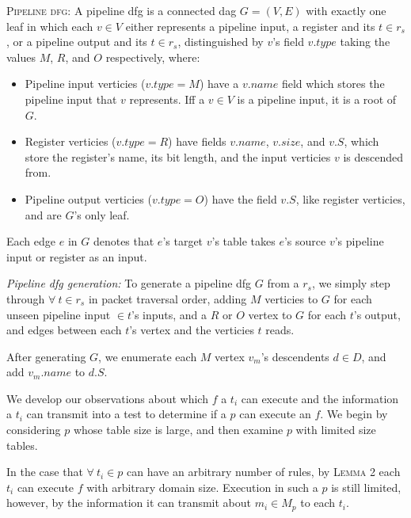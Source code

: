 \vspace{2mm}
\noindent \textsc{Pipeline dfg:} A pipeline dfg is a connected dag $G = (V, E)$ with exactly one leaf in which each $v \in V$ either represents a pipeline input, a register and its $t \in r_s$, or a pipeline output and its $t \in r_s$, distinguished by $v$'s field $v.type$ taking the values $M$, $R$, and $O$ respectively, where:
\begin{itemize}

 \item Pipeline input verticies ($v.type = M$) have a $v.name$ field which stores the pipeline input that $v$ represents. Iff a $v \in V$ is a pipeline input, it is a root of $G$.

 \item Register verticies ($v.type = R$) have fields $v.name$, $v.size$, and $v.S$, which store the register's name, its bit length, and the input verticies $v$ is descended from.

 \item Pipeline output verticies ($v.type = O$) have the field $v.S$, like register verticies, and are $G$'s only leaf.

\end{itemize}

\noindent Each edge $e$ in $G$ denotes that $e$'s target $v$'s table takes $e$'s source $v$'s pipeline input or register as an input.
\vspace{2mm}

\noindent \textit{Pipeline dfg generation:} To generate a pipeline dfg $G$ from a $r_s$, we simply step through $\forall\ t \in r_s$ in packet traversal order, adding $M$ verticies to $G$ for each unseen pipeline input $\in t$'s inputs, and a $R$ or $O$ vertex to $G$ for each $t$'s output, and edges between each $t$'s vertex and the verticies $t$ reads.

After generating $G$, we enumerate each $M$ vertex $v_m$'s descendents $d \in D$, and add $v_m.name$ to $d.S$.

 We develop our observations about which $f$ a $t_i$ can execute and the information a $t_i$ can transmit into a test to determine if a $p$ can execute an $f$. We begin by considering $p$ whose table size is large, and then examine $p$ with limited size tables.

In the case that $\forall\ t_i \in p$ can have an arbitrary number of rules, by \textsc{Lemma 2} each $t_i$ can execute $f$ with arbitrary domain size. Execution in such a $p$ is still limited, however, by the information it can transmit about $m_i \in M_p$ to each $t_i$. 


